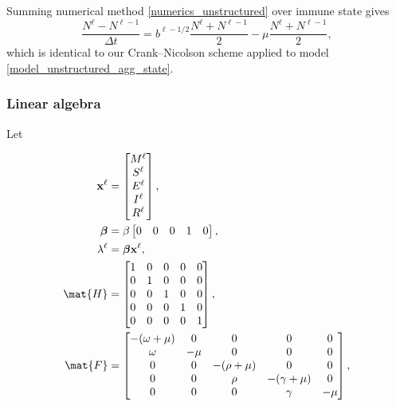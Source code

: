 \documentclass{jpmarticle}
\renewcommand{\vec}[1]{\boldsymbol{\mathrm{#1}}}
\let\subequationsorig\subequations%
\let\endsubequationsorig\endsubequations%
\renewenvironment{subequations}{
  \subequationsorig
  \renewcommand{\theequation}{\theparentequation.\arabic{equation}}
}{
  \endsubequationsorig
}
\begin{document}
Summing numerical method \eqref{numerics_unstructured} over
immune state gives
\begin{equation}
  \label{numerics_unstructured_agg_state}
  \frac{N^{\ell} - N^{\ell - 1}}{\Delta t}
  = b^{\ell - 1 / 2} \frac{N^{\ell} + N^{\ell - 1}}{2}
  - \mu \frac{N^{\ell} + N^{\ell - 1}}{2},
\end{equation}
which is identical to our Crank--Nicolson scheme applied to model
\eqref{model_unstructured_agg_state}.


\subsubsection{Linear algebra}

Let
\begin{subequations}
  \begin{align}
    \vec{x}^{\ell} &=
    \begin{bmatrix}
      M^{\ell} \\ S^{\ell} \\ E^{\ell} \\ I^{\ell} \\ R^{\ell}
    \end{bmatrix},
    \\
    \vec{\beta} &=
    \beta
    \begin{bmatrix}
      0 & 0 & 0 & 1 & 0
    \end{bmatrix},
    \\
    \lambda^{\ell} &=
    \vec{\beta} \vec{x}^{\ell},
    \\
    \mat{H} &=
    \begin{bmatrix}
      1 & 0 & 0 & 0 & 0 \\
      0 & 1 & 0 & 0 & 0 \\
      0 & 0 & 1 & 0 & 0 \\
      0 & 0 & 0 & 1 & 0 \\
      0 & 0 & 0 & 0 & 1
    \end{bmatrix},
    \\
    \mat{F} &=
    \begin{bmatrix}
      - (\omega + \mu) & 0 & 0 & 0 & 0 \\
      \omega & - \mu & 0 & 0 & 0 \\
      0 & 0 & - (\rho + \mu) & 0 & 0 \\
      0 & 0 & \rho & - (\gamma + \mu) & 0 \\
      0 & 0 & 0 & \gamma & - \mu
    \end{bmatrix},
    \\

\end{align}
\end{subequations}
\end{document}
